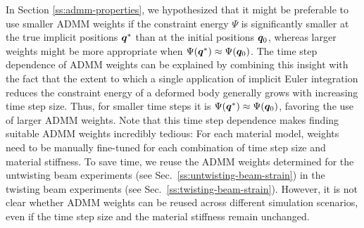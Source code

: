 In Section \ref{ss:admm-properties}, we hypothesized that it might be preferable to use smaller ADMM weights if the constraint energy $\Psi$ is significantly smaller at the true 
implicit positions $\bm{q}^*$ than at the initial positions $\bm{q}_0$, whereas larger weights might be more appropriate when $\Psi(\bm{q}^*) \approx \Psi(\bm{q}_0)$.
The time step dependence of ADMM weights can be explained by combining this insight with the fact that the extent to which a single application of implicit Euler integration 
reduces the constraint energy of a deformed body generally grows with increasing time step size. Thus, for smaller time steps it is 
$\Psi(\bm{q}^*) \approx \Psi(\bm{q}_0)$, favoring the use of larger ADMM weights. Note that this time step dependence 
makes finding suitable ADMM weights incredibly tedious: For each material model, weights need to be manually fine-tuned for each combination of time step size and 
material stiffness. To save time, we reuse the ADMM weights determined for the untwisting beam experiments (see Sec.\ \ref{ss:untwisting-beam-strain}) in the twisting 
beam experiments (see Sec.\ \ref{ss:twisting-beam-strain}). However, it is not clear whether ADMM weights can be reused across different simulation scenarios, even if the time step 
size and the material stiffness remain unchanged.

